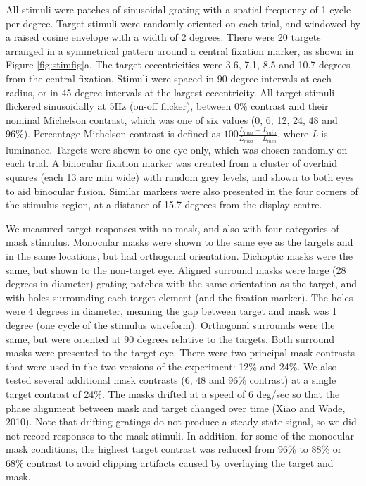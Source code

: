 \documentclass[]{article}
\begin{document}
All stimuli were patches of sinusoidal grating with a spatial frequency of 1 cycle per degree. Target stimuli were randomly oriented on each trial, and windowed by a raised cosine envelope with a width of 2 degrees. There were 20 targets arranged in a symmetrical pattern around a central fixation marker, as shown in Figure \ref{fig:stimfig}a. The target eccentricities were 3.6, 7.1, 8.5 and 10.7 degrees from the central fixation. Stimuli were spaced in 90 degree intervals at each radius, or in 45 degree intervals at the largest eccentricity. All target stimuli flickered sinusoidally at 5Hz (on-off flicker), between 0\% contrast and their nominal Michelson contrast, which was one of six values (0, 6, 12, 24, 48 and 96\%). Percentage Michelson contrast is defined as \(100\frac{L_{max}-L_{min}}{L_{max}+L_{min}}\), where \emph{L} is luminance. Targets were shown to one eye only, which was chosen randomly on each trial. A binocular fixation marker was created from a cluster of overlaid squares (each 13 arc min wide) with random grey levels, and shown to both eyes to aid binocular fusion. Similar markers were also presented in the four corners of the stimulus region, at a distance of 15.7 degrees from the display centre.

We measured target responses with no mask, and also with four categories of mask stimulus. Monocular masks were shown to the same eye as the targets and in the same locations, but had orthogonal orientation. Dichoptic masks were the same, but shown to the non-target eye. Aligned surround masks were large (28 degrees in diameter) grating patches with the same orientation as the target, and with holes surrounding each target element (and the fixation marker). The holes were 4 degrees in diameter, meaning the gap between target and mask was 1 degree (one cycle of the stimulus waveform). Orthogonal surrounds were the same, but were oriented at 90 degrees relative to the targets. Both surround masks were presented to the target eye. There were two principal mask contrasts that were used in the two versions of the experiment: 12\% and 24\%. We also tested several additional mask contrasts (6, 48 and 96\% contrast) at a single target contrast of 24\%. The masks drifted at a speed of 6 deg/sec so that the phase alignment between mask and target changed over time (Xiao and Wade, 2010). Note that drifting gratings do not produce a steady-state signal, so we did not record responses to the mask stimuli. In addition, for some of the monocular mask conditions, the highest target contrast was reduced from 96\% to 88\% or 68\% contrast to avoid clipping artifacts caused by overlaying the target and mask.
\end{document}
